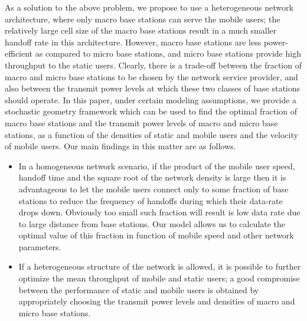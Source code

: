 \documentclass[10pt,journal]{IEEEtran}
\begin{document}
As a solution to the above problem, we propose to use a heterogeneous network architecture, where only macro base stations can serve the 
mobile users; the relatively large cell size of the macro base stations result in a much smaller handoff rate in this architecture. However, 
macro base stations are less power-efficient as compared to micro base stations, and micro base stations 
provide high throughput to the static users. Clearly, there is a trade-off between the fraction of macro and micro base stations 
to be chosen by the network service provider, and also between the transmit power levels at which these two classes of base 
stations should operate. In this paper, under certain modeling assumptions, we provide a stochastic geometry framework which can be used to find the optimal 
fraction of macro base stations and the transmit power levels of macro and micro base stations, as a function of the densities of static and mobile users and the 
velocity of mobile users.
Our main findings  in this matter are as follows.
\begin{itemize}
\item In a homogeneous network scenario, if the product of the mobile
  user speed, handoff time and the square root of the network density  
is large then  it is  advantageous to let the mobile users
connect only to some fraction  of base stations to reduce the frequency
of handoffs during which their data-rate drops down. Obviously too
small such fraction  will result is low data rate 
due to large distance from base stations. Our model
allows us to calculate the optimal value of this fraction 
in function of mobile speed and other network parameters.
\item If a heterogeneous structure of the  network is allowed, it is
  possible to further  optimize  the  mean  throughput  of mobile and  static  users; 
  a good compromise between the performance of static and mobile users is obtained by appropriately choosing the transmit power levels and 
  densities of macro and micro base stations.
\end{itemize}
\end{document}
